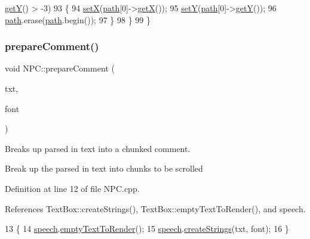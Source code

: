 \begin{DoxyCode}
      \hyperlink{class_sprite_a53ea8b27bcd0dab0627a2dceab2b9d98}{getY}() > -3)
93         \{
94             \hyperlink{class_sprite_ae21322c28b8719af996990fafa920762}{setX}(\hyperlink{class_n_p_c_afdd6b1a6e4827259ec9d9fcd075cb099}{path}[0]->\hyperlink{class_sprite_a03d6c82bddfd3d164ce8997482c57c85}{getX}());
95             \hyperlink{class_sprite_afe7d6d636fc460358c40a403af259d0e}{setY}(\hyperlink{class_n_p_c_afdd6b1a6e4827259ec9d9fcd075cb099}{path}[0]->\hyperlink{class_sprite_a53ea8b27bcd0dab0627a2dceab2b9d98}{getY}());
96             \hyperlink{class_n_p_c_afdd6b1a6e4827259ec9d9fcd075cb099}{path}.erase(\hyperlink{class_n_p_c_afdd6b1a6e4827259ec9d9fcd075cb099}{path}.begin());
97         \}
98     \}
99 \}
\end{DoxyCode}
\mbox{\label{class_n_p_c_af0a849c937b7d765b2bec4d122a2b62c}} 
\subsubsection{\texorpdfstring{prepare\+Comment()}{prepareComment()}}
{\footnotesize\ttfamily void N\+P\+C\+::prepare\+Comment (\begin{DoxyParamCaption}\item[{std\+::string}]{txt,  }\item[{T\+T\+F\+\_\+\+Font $\ast$}]{font }\end{DoxyParamCaption})}



Breaks up parsed in text into a chunked comment. 

Break up the parsed in text into chunks to be scrolled 

Definition at line 12 of file N\+P\+C.\+cpp.



References Text\+Box\+::create\+Strings(), Text\+Box\+::empty\+Text\+To\+Render(), and speech.


\begin{DoxyCode}
13 \{
14     \hyperlink{class_n_p_c_a1a1be15df827227f45559388897a9cd5}{speech}.\hyperlink{class_text_box_a3c57ce309c31e346dbc504b5e23d7ebc}{emptyTextToRender}();
15     \hyperlink{class_n_p_c_a1a1be15df827227f45559388897a9cd5}{speech}.\hyperlink{class_text_box_a19cb5e85c864060ecdb2fe2bab6fd54d}{createStrings}(txt, font);
16 \}
\end{DoxyCode}
\mbox{\label{class_n_p_c_ad5e9a664ceae6a920e63d34f2738b21d}} 
